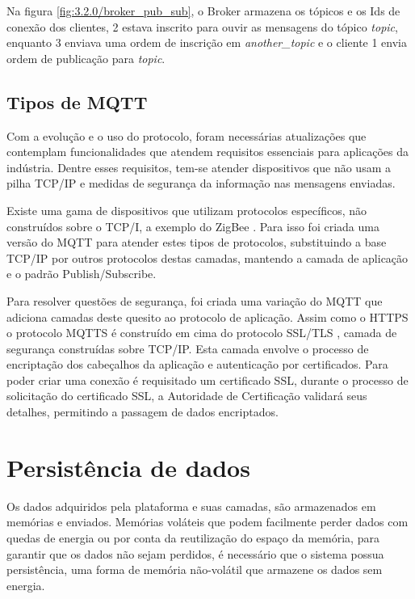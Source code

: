 Na figura \ref{fig:3.2.0/broker_pub_sub}, o Broker armazena os tópicos e os Ids de conexão dos clientes, 2 estava inscrito para ouvir as mensagens do tópico \textit{topic}, enquanto 3 enviava uma ordem de inscrição em \textit{another\_topic} e o cliente 1 envia ordem de publicação para \textit{topic}.


\subsection{Tipos de MQTT}
\label{subsection:tipos_mqtt}

Com a evolução e o uso do protocolo, foram necessárias atualizações que contemplam funcionalidades que atendem  requisitos essenciais para aplicações da indústria. Dentre esses requisitos, tem-se atender dispositivos que não usam a pilha TCP/IP e medidas de segurança da informação nas mensagens enviadas. 

Existe uma gama de dispositivos que utilizam protocolos específicos, não construídos sobre o TCP/I, a exemplo do ZigBee \cite{zigbee}. Para isso foi criada uma versão do MQTT para atender estes tipos de protocolos, substituindo a base TCP/IP por outros protocolos destas camadas, mantendo a camada de aplicação e o padrão Publish/Subscribe.

Para resolver questões de segurança, foi criada uma variação do MQTT que adiciona camadas deste quesito ao protocolo de aplicação. Assim como o HTTPS o protocolo MQTTS é construído em cima do protocolo SSL/TLS \cite{ssl}, camada de segurança construídas sobre TCP/IP. Esta camada envolve o processo de encriptação dos cabeçalhos da aplicação e autenticação por certificados. Para poder criar uma conexão é requisitado um certificado SSL, durante o processo de solicitação do certificado SSL, a Autoridade de Certificação validará seus detalhes, permitindo a passagem de dados encriptados.

\section{Persistência de dados}
\label{section:persistencia}

Os dados adquiridos pela plataforma e suas camadas, são armazenados em memórias e enviados. Memórias voláteis que podem facilmente perder dados com quedas de energia ou por conta da reutilização do espaço da memória, para garantir que os dados não sejam perdidos, é necessário que o sistema possua persistência, uma forma de memória não-volátil que armazene os dados sem energia.

